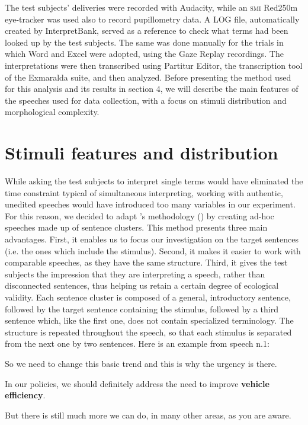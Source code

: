 \documentclass[output=paper]{langsci/langscibook}
\begin{document}
The test subjects’ deliveries were recorded with Audacity, while an \textsc{smi} Red250m eye-tracker was used also to record pupillometry data. A LOG file, automatically created by InterpretBank, served as a reference to check what terms had been looked up by the test subjects. The same was done manually for the trials in which Word and Excel were adopted, using the Gaze Replay recordings. The interpretations were then transcribed using Partitur Editor, the transcription tool of the Exmaralda suite, and then analyzed. Before presenting the method used for this analysis and its results in section 4, we will describe the main features of the speeches used for data collection, with a focus on stimuli distribution and morphological complexity.

\section{Stimuli features and distribution}\label{sec:prandi:4}
While asking the test subjects to interpret single terms would have eliminated the time constraint typical of simultaneous interpreting, working with authentic, unedited speeches would have introduced too many variables in our experiment. For this reason, we decided to adapt \citeauthor{Seeber2011a}’s methodology (\citeyear{Seeber2011a}) by creating ad-hoc speeches made up of sentence clusters. This method presents three main advantages. First, it enables us to focus our investigation on the target sentences (i.e. the ones which include the stimulus). Second, it makes it easier to work with comparable speeches, as they have the same structure. Third, it gives the test subjects the impression that they are interpreting a speech, rather than disconnected sentences, thus helping us retain a certain degree of ecological validity. Each sentence cluster is composed of a general, introductory sentence, followed by the target sentence containing the stimulus, followed by a third sentence which, like the first one, does not contain specialized terminology. The structure is repeated throughout the speech, so that each stimulus is separated from the next one by two sentences. Here is an example from speech n.1:

\ea
So we need to change this basic trend and this is why the urgency is there.

In our policies, we should definitely address the need to improve \textbf{vehicle efficiency}.

But there is still much more we can do, in many other areas, as you are aware.
\end{document}
